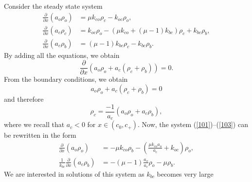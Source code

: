 Consider the steady state system
\begin{align}
\frac{\partial}{\partial x}\left(  a_{o}\rho_{o}\right)   &  =\mu k_{co}%
\rho_{c}-k_{oc}\rho_{o}, \label{101}\\
\frac{\partial}{\partial x}\left(  a_{c}\rho_{c}\right)   &  =k_{oc}\rho
_{o}-\left(  \mu k_{co}+\left(  \mu-1\right)  k_{bc}\right)  \rho_{c}%
+k_{bc}\rho_{b}, \label{102}\\
\frac{\partial}{\partial x}\left(  a_{c}\rho_{b}\right)   &  =\left(
\mu-1\right)  k_{bc}\rho_{c}-k_{bc}\rho_{b}. \label{103}
\end{align}
By adding all the equations, we obtain%
\begin{equation}
\frac{\partial}{\partial x}\left(  a_{o}\rho_{o}+a_{c}\left(  \rho_{c}%
+\rho_{b}\right)  \right)  =0.
\end{equation}
From the boundary conditions,  we obtain
\begin{equation}
a_{o}\rho_{o}+a_{c}\left(  \rho_{c}+\rho_{b}\right)  =0
\end{equation}
and therefore%
\begin{equation}
\rho_{c}=\frac{-1}{a_{c}}\left(  a_{o}\rho_{o}+a_{c}\rho_{b}\right),
\end{equation}
where we recall that  $a_{c}<0$ for $x\in\left(
c_{0},c_{+}\right)$. 
Now, the system (\ref{101})--(\ref{103}) can be rewritten in the form%
\begin{align}
\frac{\partial}{\partial x}\left(  a_{o}\rho_{o}\right)   &  =-\mu k_{co}%
\rho_{b}-\left(  \frac{\mu k_{co}a_{o}}{a_{c}}+k_{oc}\right)  \rho_{o},\\
\frac{1}{k_{bc}}\frac{\partial}{\partial x}\left(  a_{c}\rho_{b}\right)   &
=-\left(  \mu-1\right)  \frac{a_{o}}{a_{c}}\rho_{o}-\mu\rho_{b}.
\end{align}
We are interested in solutions of this system as $k_{bc}$ becomes very large
